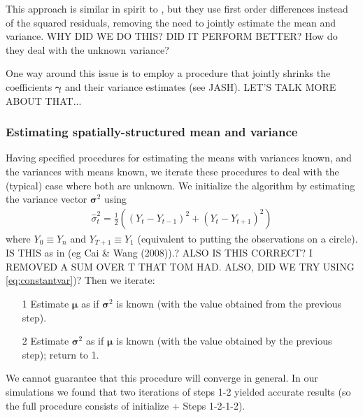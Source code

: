 \documentclass[12pt]{article}
\newcommand{\Gg}{\gamma}     \newcommand{\GG}{\Gamma}
\newcommand{\s}{\sigma}
\begin{document}
This approach is similar in spirit to \cite{Cai2008Adaptive}, but they use first order differences instead of the squared residuals, removing the need to jointly estimate the mean and variance. 
WHY DID WE DO THIS? DID IT PERFORM BETTER? How do they deal with the unknown variance?

   One way around this issue is to employ a procedure that jointly shrinks the coefficients $\bm{\Gg}$ and their variance estimates (see JASH). LET'S TALK MORE ABOUT THAT...


\subsubsection{Estimating spatially-structured mean and variance}

Having specified procedures for estimating the means with variances known, and the variances with means known,
we iterate these procedures to deal with the (typical) case where both are unknown.
We initialize the algorithm by estimating the variance vector $\bm{\s}^2$ using
\begin{eqnarray}\label{eq:initial var est}
\hat{\s}_t^2=\frac{1}{2}\left((Y_t-Y_{t-1})^2+(Y_t-Y_{t+1})^2\right)
\end{eqnarray}
where $Y_0\equiv Y_n$ and $Y_{T+1}\equiv Y_1$ (equivalent to putting the observations on a circle). 
IS THIS as in (eg Cai \& Wang (2008)).? ALSO IS THIS CORRECT? I REMOVED A SUM OVER T THAT TOM HAD.
ALSO, DID WE TRY USING \eqref{eq:constantvar})?
Then we iterate:
\begin{enumerate}
\item[1] Estimate $\bm{\mu}$ as if $\bm{\s}^2$ is known (with the value obtained from the previous step).
\item[2] Estimate $\bm{\s}^2$ as if ${\bm{\mu}}$ is known (with the value obtained by the previous step); return to 1.
\end{enumerate}
We cannot guarantee that this procedure will converge in general. In our simulations we found
that two iterations of steps 1-2 yielded accurate results (so the full procedure consists of initialize + Steps 1-2-1-2).
\end{document}

